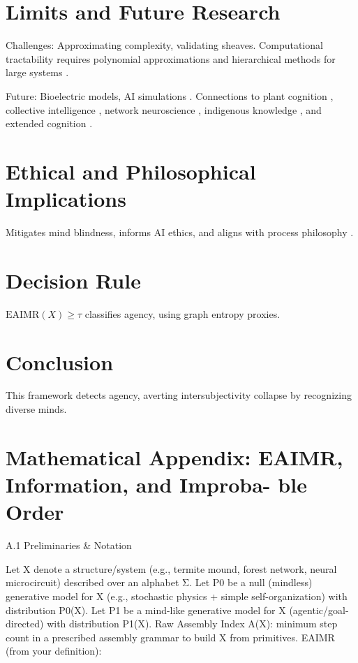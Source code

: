 \documentclass{article}
\begin{document}
\section{Limits and Future Research}
\label{sec:limits}

Challenges: Approximating complexity, validating sheaves. Computational tractability requires polynomial approximations and hierarchical methods for large systems \citep{kolmogorov1965three}.

Future: Bioelectric models, AI simulations \citep{levin2019computational}. Connections to plant cognition \citep{calvo2020plants}, collective intelligence \citep{camazine2001self}, network neuroscience \citep{bassett2017network}, indigenous knowledge \citep{kimmerer2013braiding}, and extended cognition \citep{clark2010supersizing}.

\section{Ethical and Philosophical Implications}
\label{sec:ethics}

Mitigates mind blindness, informs AI ethics, and aligns with process philosophy \citep{dennett1987intentional, whitehead1929process, deleuze1987thousand}.

\section{Decision Rule}
\label{sec:decision}

\(\text{EAIMR}(X) \geq \tau\) classifies agency, using graph entropy proxies.

\section{Conclusion}
\label{sec:conclusion}

This framework detects agency, averting intersubjectivity collapse by recognizing diverse minds.

\appendix

\section{Mathematical Appendix: EAIMR, Information, and Improba-
ble Order}

A.1
Preliminaries & Notation

Let X denote a structure/system (e.g., termite mound, forest network, neural microcircuit) described over
an alphabet Σ.
Let P0 be a null (mindless) generative model for X (e.g., stochastic physics + simple self-organization)
with distribution P0(X).
Let P1 be a mind-like generative model for X (agentic/goal-directed) with distribution P1(X).
Raw Assembly Index A(X): minimum step count in a prescribed assembly grammar to build X from
primitives.
EAIMR (from your definition):
\end{document}
